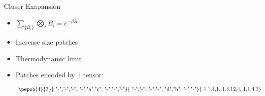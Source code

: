 \begin{frame}{Cluser Exapansion}
\begin{minipage}{0.5\textwidth}
    \end{minipage}
    \begin{minipage}{0.49\textwidth}

         {

            \begin{itemize}
                \item $\sum_{ \{B_i\} } \bigotimes_i B_i =  e^{-\beta \hat{H}} $
                \item Increase size patches
                \item Thermodynamic limit
                \item Patches encoded by 1 tensor:

                      \begin{equation}
                          \vcenter{ \hbox{ \pepob{4}{3}{{
                                              "-","-","-",
                                              "-","a","c",
                                              "-","-","-"}}{{
                                              "-","-",
                                              "-","-",
                                              "d","b",
                                              "-","-"}}{{
                                              1,1,4,1,
                                              1,4,12,4,
                                              1,1,4,1}} }}
                      \end{equation}

            \end{itemize}

        }

         {
            }
\end{minipage}
\end{frame}

